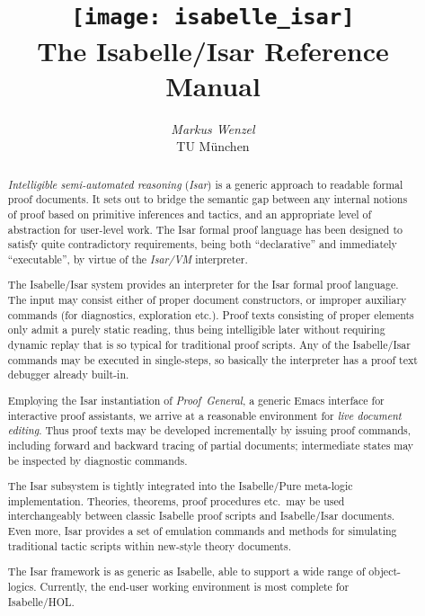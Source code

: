 \documentclass[12pt,a4paper,fleqn]{report}
\title{\texttt{[image: isabelle\_isar]} \\[4ex] The Isabelle/Isar Reference Manual}
\author{\emph{Markus Wenzel} \\ TU M\"unchen}
\begin{document}
\underscoreoff

\maketitle 

\begin{abstract}
  \emph{Intelligible semi-automated reasoning} (\emph{Isar}) is a generic
  approach to readable formal proof documents.  It sets out to bridge the
  semantic gap between any internal notions of proof based on primitive
  inferences and tactics, and an appropriate level of abstraction for
  user-level work.  The Isar formal proof language has been designed to
  satisfy quite contradictory requirements, being both ``declarative'' and
  immediately ``executable'', by virtue of the \emph{Isar/VM} interpreter.
  
  The Isabelle/Isar system provides an interpreter for the Isar formal proof
  language.  The input may consist either of proper document constructors, or
  improper auxiliary commands (for diagnostics, exploration etc.).  Proof
  texts consisting of proper elements only admit a purely static reading, thus
  being intelligible later without requiring dynamic replay that is so typical
  for traditional proof scripts.  Any of the Isabelle/Isar commands may be
  executed in single-steps, so basically the interpreter has a proof text
  debugger already built-in.
  
  Employing the Isar instantiation of \emph{Proof~General}, a generic Emacs
  interface for interactive proof assistants, we arrive at a reasonable
  environment for \emph{live document editing}.  Thus proof texts may be
  developed incrementally by issuing proof commands, including forward and
  backward tracing of partial documents; intermediate states may be inspected
  by diagnostic commands.
  
  The Isar subsystem is tightly integrated into the Isabelle/Pure meta-logic
  implementation.  Theories, theorems, proof procedures etc.\ may be used
  interchangeably between classic Isabelle proof scripts and Isabelle/Isar
  documents.  Even more, Isar provides a set of emulation commands and methods
  for simulating traditional tactic scripts within new-style theory documents.
  
  The Isar framework is as generic as Isabelle, able to support a wide range
  of object-logics.  Currently, the end-user working environment is most
  complete for Isabelle/HOL.
\end{abstract}
\end{document}
